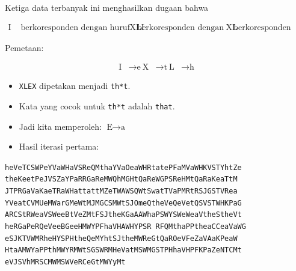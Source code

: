\documentclass{article}
\begin{document}
Ketiga data terbanyak ini menghasilkan dugaan bahwa

\begin{align*}
  \text{I} & \text{ berkoresponden dengan huruf plainteks e,}\
  \text{XLI} & \text{ berkoresponden dengan the,}\
  \text{XL} & \text{ berkoresponden dengan th}
\end{align*}

Pemetaan:

\begin{align*}
  \text{I} & \rightarrow \text{e}\
  \text{X} & \rightarrow \text{t}\
  \text{L} & \rightarrow \text{h}
\end{align*}

\newpage


\begin{itemize}
    \item \texttt{XLEX} dipetakan menjadi \texttt{th*t}.
    \item Kata yang cocok untuk \texttt{th*t} adalah \texttt{that}.
    \item Jadi kita memperoleh: $\text{E} \rightarrow \text{a}$
    \item Hasil iterasi pertama:
\end{itemize}

\vspace{5mm}

\begin{center}
\texttt{heVeTCSWPeYVaWHaVSReQMthaYVaOeaWHRtatePFaMVaWHKVSTYhtZe\\
theKeetPeJVSZaYPaRRGaReMWQhMGHtQaReWGPSReHMtQaRaKeaTtM\\
JTPRGaVaKaeTRaWHattattMZeTWAWSQWtSwatTVaPMRtRSJGSTVRea\\
YVeatCVMUeMWarGMeWtMJMGCSMWtSJOmeQtheVeQeVetQSVSTWHKPaG\\
ARCStRWeaVSWeeBtVeZMtFSJtheKGaAAWhaPSWYSWeWeaVtheStheVt\\
heRGaPeRQeVeeBGeeHMWYPFhaVHAWHYPSR RFQMthaPPtheaCCeaVaWG\\
eSJKTVWMRheHYSPHtheQeMYhtSJtheMWReGtQaROeVFeZaVAaKPeaW\\
HtaAMWYaPPthMWYRMWtSGSWRMHeVatMSWMGSTPHhaVHPFKPaZeNTCMt\\
eVJSVhMRSCMWMSWVeRCeGtMWYyMt}
\end{center}

\newpage

\end{document}
